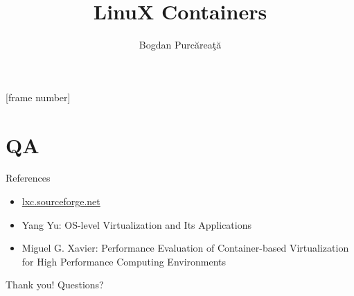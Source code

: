 \documentclass{beamer}
\title{LinuX Containers}
\author{Bogdan Purc\u{a}rea\c{t}\u{a}}
\begin{document}
[frame number]

\frame{\titlepage}

\frame{\tableofcontents}









\section{QA}

\begin{frame}{References}
\begin{itemize}
\item \url{lxc.sourceforge.net}
\item Yang Yu: OS-level Virtualization and Its Applications
\item Miguel G. Xavier: Performance Evaluation of Container-based Virtualization for High Performance Computing Environments
\end{itemize}
\end{frame}

\begin{frame}{Thank you!}
\centering
Questions?
\end{frame}
\end{document}
